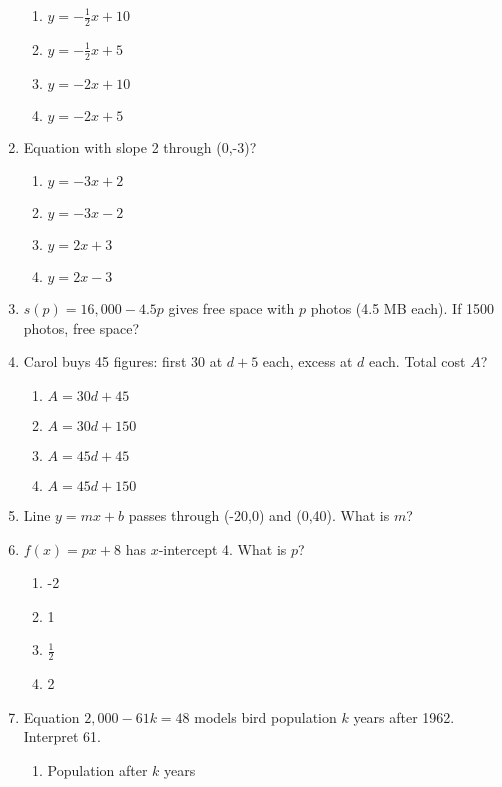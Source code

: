 \documentclass[12pt]{exam}
\begin{document}
\begin{enumerate}
\begin{center}
    \end{center}
    \begin{enumerate}[label=\Alph*)]
        \item $y = -\frac{1}{2}x + 10$
        \item $y = -\frac{1}{2}x + 5$
        \item $y = -2x + 10$
        \item $y = -2x + 5$
    \end{enumerate}
    \item Equation with slope 2 through (0,-3)?
    \begin{enumerate}[label=\Alph*)]
        \item $y = -3x + 2$
        \item $y = -3x - 2$
        \item $y = 2x + 3$
        \item $y = 2x - 3$
    \end{enumerate}
    \item $s(p) = 16,000 - 4.5p$ gives free space with $p$ photos (4.5 MB each). If 1500 photos, free space?
    \item Carol buys 45 figures: first 30 at $d+5$ each, excess at $d$ each. Total cost $A$?
    \begin{enumerate}[label=\Alph*)]
        \item $A = 30d + 45$
        \item $A = 30d + 150$
        \item $A = 45d + 45$
        \item $A = 45d + 150$
    \end{enumerate}
    \item Line $y = mx + b$ passes through (-20,0) and (0,40). What is $m$?
    \item $f(x) = px + 8$ has $x$-intercept 4. What is $p$?
    \begin{enumerate}[label=\Alph*)]
        \item -2
        \item 1
        \item $\frac{1}{2}$
        \item 2
    \end{enumerate}
    \item Equation $2,000 - 61k = 48$ models bird population $k$ years after 1962. Interpret 61.
    \begin{enumerate}[label=\Alph*)]
        \item Population after $k$ years

\end{enumerate}
\end{enumerate}
\end{document}
